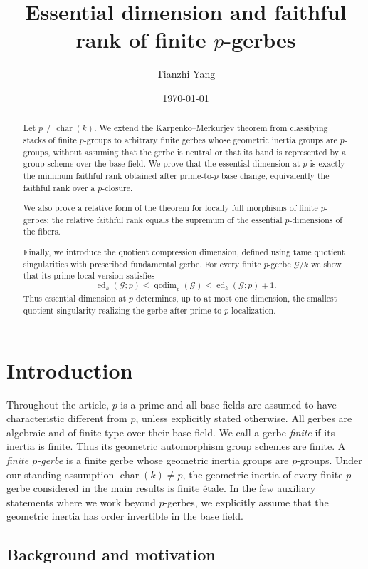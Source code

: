 \documentclass[11pt,reqno]{amsart}
\title[Essential dimension and faithful rank of finite $p$-gerbes]{Essential dimension and faithful rank of finite $p$-gerbes}
\author{Tianzhi Yang}
\date{\today}
\numberwithin{equation}{section}
\theoremstyle{plain}
\theoremstyle{definition}
\def\cG{{\mathcal G}}
\def\ed{{\operatorname{ed}}}
\begin{document}
\begin{abstract}
Let $p\ne\operatorname{char}(k)$.  We extend the Karpenko--Merkurjev
theorem from classifying stacks of finite $p$-groups to arbitrary finite
gerbes whose geometric inertia groups are $p$-groups, without assuming
that the gerbe is neutral or that its band is represented by a group
scheme over the base field.  We prove that the essential dimension at
$p$ is exactly the minimum faithful rank obtained after prime-to-$p$
base change, equivalently the faithful rank over a $p$-closure.

We also prove a relative form of the theorem for locally full morphisms
of finite $p$-gerbes: the relative faithful rank equals the supremum of
the essential $p$-dimensions of the fibers.

Finally, we introduce the quotient compression dimension, defined using tame quotient singularities with prescribed fundamental gerbe. For every finite $p$-gerbe $\cG/k$ we
show that its prime local version satisfies
\[
\ed_k(\cG;p)
\le \operatorname{qcdim}_p(\cG)
\le \ed_k(\cG;p)+1.
\]
Thus essential dimension at $p$ determines, up to at most one dimension,
the smallest quotient singularity realizing the gerbe after prime-to-$p$
localization.
\end{abstract}

\maketitle

\section{Introduction}\label{sec:introduction}

Throughout the article, $p$ is a prime and all base fields are assumed to
have characteristic different from $p$, unless explicitly stated otherwise.
All gerbes are algebraic and of finite type over their base field.  We call a
gerbe \emph{finite} if its inertia is finite.  Thus its geometric
automorphism group schemes are finite.  A \emph{finite $p$-gerbe} is a finite
gerbe whose geometric inertia groups are $p$-groups.  Under our standing
assumption $\operatorname{char}(k)\ne p$, the geometric inertia of every finite
$p$-gerbe considered in the main results is finite \'etale.  In the few
auxiliary statements where we work beyond $p$-gerbes, we explicitly assume
that the geometric inertia has order invertible in the base field. 

\subsection{Background and motivation}
\end{document}
